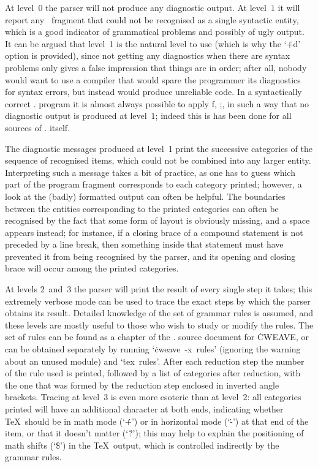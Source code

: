 At level~$0$ the parser will not produce any diagnostic output. At level~$1$
it will report any \Cee~fragment that could not be recognised as a single
syntactic entity, which is a good indicator of grammatical problems and
possibly of ugly output. It can be argued that level~1 is the natural level
to use (which is why the `\.{+d}' option is provided), since not getting any
diagnostics when there are syntax problems only gives a false impression
that things are in order; after all, nobody would want to use a compiler
that would spare the programmer its diagnostics for syntax errors, but
instead would produce unreliable code. In a syntactically correct \CWEB.
program it is almost always possible to apply \:f, \:;, \:[ and~\:] in such
a way that no diagnostic output is produced at level~$1$; indeed this is has
been done for all sources of \CWEBx. itself.

The diagnostic messages produced at level~1 print the successive categories
of the sequence of recognised items, which could not be combined into any
larger entity. Interpreting such a message takes a bit of practice, as one
has to guess which part of the program fragment corresponds to each category
printed; however, a look at the (badly) formatted output can often be
helpful. The boundaries between the entities corresponding to the printed
categories can often be recognised by the fact that some form of layout is
obviously missing, and a space appears instead; for instance, if a closing
brace of a compound statement is not preceded by a line break, then
something inside that statement must have prevented it from being recognised
by the parser, and its opening and closing brace will occur among the
printed categories.

At levels $2$~and~$3$ the parser will print the result of every single step
it takes; this extremely verbose mode can be used to trace the exact steps
by which the parser obtains its result. Detailed knowledge of the set of
grammar rules is assumed, and these levels are mostly useful to those who
wish to study or modify the rules. The set of rules can be found as a
chapter of the \CWEB. source document for \.{CWEAVE}, or can be obtained
separately by running `\hbox{\.{cweave -x rules}}' (ignoring the warning
about an unused module) and `\hbox{\.{tex rules}}'. After each reduction
step the number of the rule used is printed, followed by a list of
categories after reduction, with the one that was formed by the reduction
step enclosed in inverted angle brackets. Tracing at level~$3$ is even more
esoteric than at level~$2$: all categories printed will have an additional
character at both ends, indicating whether \TeX\ should be in math mode
(`\.+') or in horizontal mode (`\.-') at that end of the item, or that it
doesn't matter (`\.?'); this may help to explain the positioning of math
shifts (`\.\$') in the \TeX\ output, which is controlled indirectly by the
grammar rules.

